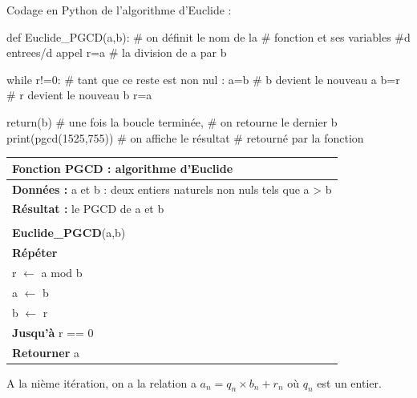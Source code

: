 \documentclass[10pt,fleqn]{article} %
\begin{document}
\begin{minipage}[c]{.48\linewidth}
\begin{py}
Codage en Python de l'algorithme d'Euclide :
\begin{python}
def Euclide_PGCD(a,b):	# on définit le nom de la 
			# fonction et ses variables 
			#d entrees/d appel
    r=a%
			# la division de a par b
    
    while r!=0:		# tant que ce reste est non nul :
        a=b		# b devient le nouveau a
        b=r		# r devient le nouveau b
        r=a%
        
    return(b)		# une fois la boucle terminée, 
			# on retourne le dernier b    
print(pgcd(1525,755))	# on affiche le résultat 
			# retourné par la fonction
\end{python}
\end{py}
\end{minipage}\hfill
\begin{minipage}[c]{.48\linewidth}
\begin{pseudo}
\begin{tabular}{p{}}
\hline
Fonction PGCD : algorithme d’Euclide \\
\hline
\textbf{Données :} a et b : deux entiers naturels non nuls tels que a > b \\
\textbf{Résultat :} le PGCD de a et b \\
\\
\textbf{Euclide\_PGCD}(a,b) \\
\hspace{.5cm}\textbf{Répéter}\\
\hspace{1cm}r $\leftarrow$ a mod b\\
\hspace{1cm}a $\leftarrow$ b \\
\hspace{1cm}b $\leftarrow$ r \\
\hspace{.5cm}\textbf{Jusqu’à} r == 0 \\
\hspace{.5cm}\textbf{Retourner} a\\
\hline
\end{tabular}
\end{pseudo}
\end{minipage}

A la nième itération, on a la relation a $a_n=q_n\times b_n +r_n$ où $q_n$ est un entier. 
\end{document}
